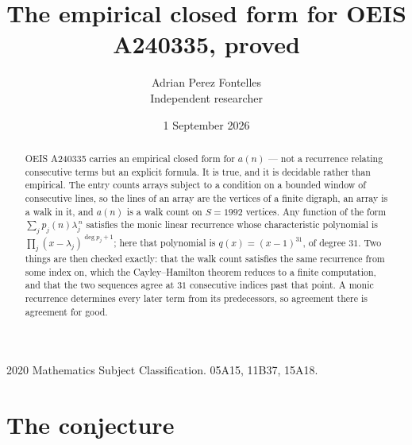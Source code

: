 \documentclass[11pt,a4paper]{article}
\title{The empirical closed form for OEIS A240335, proved}
\author{Adrian Perez Fontelles\\ \small Independent researcher}
\date{1 September 2026}
\theoremstyle{plain}
\theoremstyle{definition}
\begin{document}
\maketitle

\begin{abstract}
OEIS A240335 carries an empirical closed form for $a(n)$ --- not a recurrence relating
consecutive terms but an explicit formula. It is true, and it is decidable rather than
empirical. The entry counts arrays subject to a condition on a bounded window of consecutive lines, so the lines of an array are the
vertices of a finite digraph, an array is a walk in it, and $a(n)$ is a walk count on
$S=1992$ vertices. Any function of the form $\sum_j p_j(n)\lambda_j^{\,n}$ satisfies the
monic linear recurrence whose characteristic polynomial is
$\prod_j(x-\lambda_j)^{\deg p_j+1}$; here that polynomial is $q(x)=(x-1)^{31}$, of degree
$31$. Two things are then checked exactly: that the walk count satisfies the same
recurrence from some index on, which the Cayley--Hamilton theorem reduces to a finite
computation, and that the two sequences agree at $31$ consecutive indices past that
point. A monic recurrence determines every later term from its predecessors, so agreement
there is agreement for good.
\end{abstract}

\noindent\small 2020 Mathematics Subject Classification. 05A15, 11B37, 15A18.\normalsize

\section{The conjecture}
\end{document}

